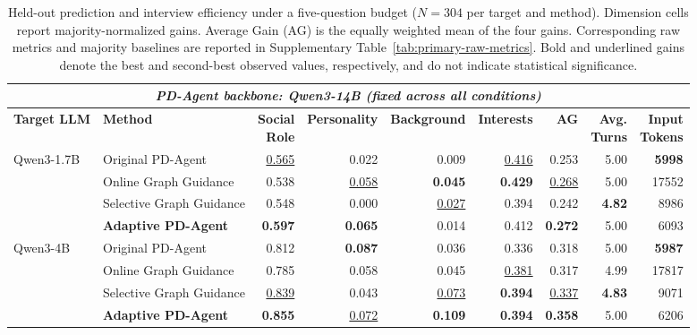 \documentclass{ieeeaccess}
\begin{document}
\begin{table}[!t]
\centering
\caption{Held-out prediction and interview efficiency under a five-question budget
($N=304$ per target and method). Dimension cells report majority-normalized gains.
Average Gain (AG) is the equally weighted mean of the four gains. Corresponding raw
metrics and majority baselines are reported in Supplementary Table~\ref{tab:primary-raw-metrics}.
Bold and underlined gains denote the best and second-best observed values, respectively,
and do not indicate statistical significance.}
\label{tab:main_results}
\footnotesize
\setlength{\tabcolsep}{4pt}
\begin{tabular*}{\textwidth}{@{\extracolsep{\fill}}llrrrrrrr@{}}
\toprule
\multicolumn{9}{c}{\textit{PD-Agent backbone: Qwen3-14B (fixed across all conditions)}} \\
\midrule
\textbf{Target LLM} & \textbf{Method}
& \makecell{\textbf{Social}\\\textbf{Role}}
& \textbf{Personality} & \textbf{Background} & \textbf{Interests}
& \textbf{AG}
& \makecell{\textbf{Avg.}\\\textbf{Turns}}
& \makecell{\textbf{Input}\\\textbf{Tokens}} \\
\midrule
\multirow{4}{*}{Qwen3-1.7B}
& Original PD-Agent & \underline{0.565} & 0.022 & 0.009 & \underline{0.416} & 0.253 & 5.00 & \textbf{5998} \\
& Online Graph Guidance & 0.538 & \underline{0.058} & \textbf{0.045} & \textbf{0.429} & \underline{0.268} & 5.00 & 17552 \\
& Selective Graph Guidance & 0.548 & 0.000 & \underline{0.027} & 0.394 & 0.242 & \textbf{4.82} & 8986 \\
& \textbf{Adaptive PD-Agent} & \textbf{0.597} & \textbf{0.065} & 0.014 & 0.412 & \textbf{0.272} & 5.00 & 6093 \\
\midrule
\multirow{4}{*}{Qwen3-4B}
& Original PD-Agent & 0.812 & \textbf{0.087} & 0.036 & 0.336 & 0.318 & 5.00 & \textbf{5987} \\
& Online Graph Guidance & 0.785 & 0.058 & 0.045 & \underline{0.381} & 0.317 & 4.99 & 17817 \\
& Selective Graph Guidance & \underline{0.839} & 0.043 & \underline{0.073} & \textbf{0.394} & \underline{0.337} & \textbf{4.83} & 9071 \\
& \textbf{Adaptive PD-Agent} & \textbf{0.855} & \underline{0.072} & \textbf{0.109} & \textbf{0.394} & \textbf{0.358} & 5.00 & 6206 \\
\midrule

\end{tabular*}
\end{table}
\end{document}
